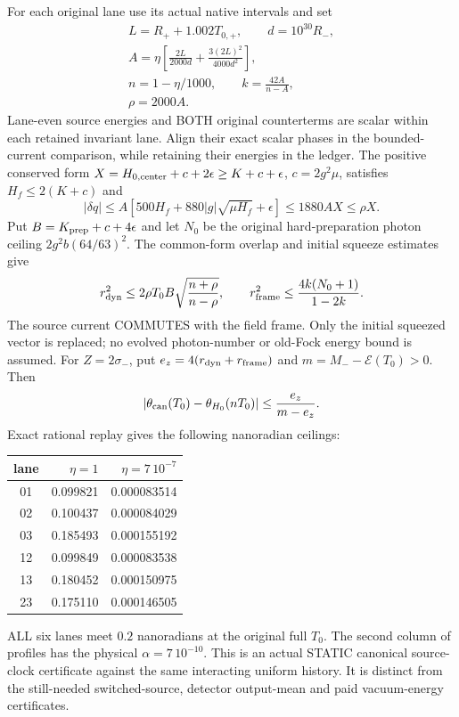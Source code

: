 For each original lane use its actual native intervals and set
\[
 \begin{gathered}
 L=R_++1.002T_{0,+},\qquad d=10^{30}R_-,\\
 A=\eta\left[\frac{2L}{2000d}+\frac{3(2L)^2}{4000d^2}\right],\\
 n=1-\eta/1000,\qquad k=\frac{42A}{n-A},\\
 \rho=2000A.
 \end{gathered}
\]
Lane-even source energies and BOTH original counterterms are scalar
within each retained invariant lane. Align their exact scalar phases in
the bounded-current comparison, while retaining their energies in the
ledger. The positive conserved form
$X=H_{0,\rm center}+c+2\epsilon\ge K+c+\epsilon$, $c=2g^2\mu$,
satisfies $H_f\le2(K+c)$ and
\[
 |\delta q|\le A[500H_f+880|g|\sqrt{\mu H_f}+\epsilon]
                  \le1880A X\le\rho X.
\]
Put $B=K_{\rm prep}+c+4\epsilon$ and let $N_0$ be the original
hard-preparation photon ceiling $2g^2b(64/63)^2$.
The common-form overlap and initial squeeze estimates give
\[
 r_{\rm dyn}^2\le2\rho T_0B\sqrt{\frac{n+\rho}{n-\rho}},\qquad
 r_{\rm frame}^2\le\frac{4k(N_0+1)}{1-2k}.
\]
The source current COMMUTES with the field frame. Only the initial
squeezed vector is replaced; no evolved photon-number or old-Fock energy
bound is assumed. For $Z=2\sigma_-$, put
$e_z=4(r_{\rm dyn}+r_{\rm frame})$ and
$m=M_--\mathcal E(T_0)>0$. Then
\[
 |\theta_{\rm can}(T_0)-\theta_{H_0}(nT_0)|
                         \le\frac{e_z}{m-e_z}.
\]
Exact rational replay gives the following nanoradian ceilings:
\begin{center}
\begin{tabular}{c|rr}
lane & $\eta=1$ & $\eta=7\,10^{-7}$\\\hline
01&0.099821&0.000083514\\
02&0.100437&0.000084029\\
03&0.185493&0.000155192\\
12&0.099849&0.000083538\\
13&0.180452&0.000150975\\
23&0.175110&0.000146505
\end{tabular}
\end{center}
ALL six lanes meet $0.2$ nanoradians at the original full $T_0$.
The second column of profiles has the physical $\alpha=7\,10^{-10}$.
This is an actual STATIC canonical source-clock certificate against the
same interacting uniform history. It is distinct from the still-needed
switched-source, detector output-mean and paid vacuum-energy certificates.

